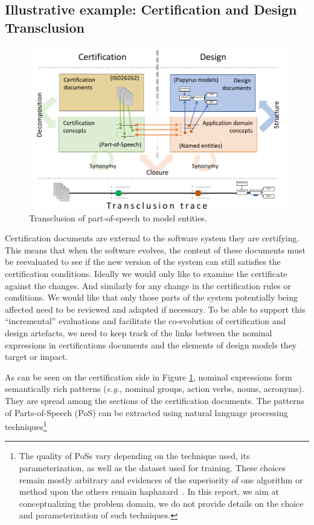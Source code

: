 \subsection{Illustrative example: Certification and Design Transclusion }
\begin{figure}[ht]
	\centering 
	\includegraphics[width=.85\linewidth]{images/metamodel-re}
	\caption{Transclusion of part-of-speech to model entities.}
	\label{fig:metamodel-re}
\end{figure}
 
Certification documents are external to the software system they are certifying. This means that when the software evolves, the content of these documents must be reevaluated to see if the new version of the system can still satisfies the certification conditions. Ideally we would only like to examine the certificate against the changes. And similarly for any change in the certification rules or conditions. We would like that only those parts of the system potentially being affected need to be reviewed and adapted if necessary. 
To be able to support this ``incremental'' evaluations and facilitate the  co-evolution of certification and design artefacts, we need to keep track of the links between the nominal expressions in certifications documents and the elements of design models they target or impact. 
 
As can be seen on the certification side in Figure \ref{fig:metamodel-re}, nominal expressions form semantically rich patterns (\textit{e.g.,} nominal groups, action verbs, nouns, acronyms). They are spread among the sections of the certification documents. The patterns of Parts-of-Speech (PoS) can be extracted using natural language processing  techniques\footnote{The quality of PoSs vary depending on the technique used, its parameterization, as well as the dataset used for training. These choices remain mostly arbitrary and evidences of the superiority of one algorithm or method upon the others remain haphazard~\cite{zou2010-term-based-enhancement-for-trace-retrieval}. In this report, we aim at conceptualizing the problem domain, we do not provide details on the choice and parameterization of such techniques.} 


